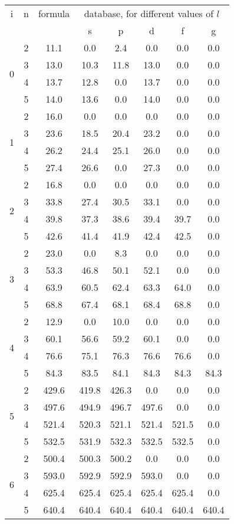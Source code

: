 \begin{tabular}{|c|c||c||c|c|c|c|c|}
\hline
i & n & formula & \multicolumn{5}{c|}{database, for different values of $l$} \tabularnewline
 & & & s & p & d & f & g \tabularnewline
\hline
\hline
\multirow{4}{*}{  0} 
 &   2 &   11.1 &    0.0 &    2.4 &    0.0 &    0.0 &    0.0 \tabularnewline
 &   3 &   13.0 &   10.3 &   11.8 &   13.0 &    0.0 &    0.0 \tabularnewline
 &   4 &   13.7 &   12.8 &    0.0 &   13.7 &    0.0 &    0.0 \tabularnewline
 &   5 &   14.0 &   13.6 &    0.0 &   14.0 &    0.0 &    0.0 \tabularnewline
\hline
\multirow{4}{*}{  1} 
 &   2 &   16.0 &    0.0 &    0.0 &    0.0 &    0.0 &    0.0 \tabularnewline
 &   3 &   23.6 &   18.5 &   20.4 &   23.2 &    0.0 &    0.0 \tabularnewline
 &   4 &   26.2 &   24.4 &   25.1 &   26.0 &    0.0 &    0.0 \tabularnewline
 &   5 &   27.4 &   26.6 &    0.0 &   27.3 &    0.0 &    0.0 \tabularnewline
\hline
\multirow{4}{*}{  2} 
 &   2 &   16.8 &    0.0 &    0.0 &    0.0 &    0.0 &    0.0 \tabularnewline
 &   3 &   33.8 &   27.4 &   30.5 &   33.1 &    0.0 &    0.0 \tabularnewline
 &   4 &   39.8 &   37.3 &   38.6 &   39.4 &   39.7 &    0.0 \tabularnewline
 &   5 &   42.6 &   41.4 &   41.9 &   42.4 &   42.5 &    0.0 \tabularnewline
\hline
\multirow{4}{*}{  3} 
 &   2 &   23.0 &    0.0 &    8.3 &    0.0 &    0.0 &    0.0 \tabularnewline
 &   3 &   53.3 &   46.8 &   50.1 &   52.1 &    0.0 &    0.0 \tabularnewline
 &   4 &   63.9 &   60.5 &   62.4 &   63.3 &   64.0 &    0.0 \tabularnewline
 &   5 &   68.8 &   67.4 &   68.1 &   68.4 &   68.8 &    0.0 \tabularnewline
\hline
\multirow{4}{*}{  4} 
 &   2 &   12.9 &    0.0 &   10.0 &    0.0 &    0.0 &    0.0 \tabularnewline
 &   3 &   60.1 &   56.6 &   59.2 &   60.1 &    0.0 &    0.0 \tabularnewline
 &   4 &   76.6 &   75.1 &   76.3 &   76.6 &   76.6 &    0.0 \tabularnewline
 &   5 &   84.3 &   83.5 &   84.1 &   84.3 &   84.3 &   84.3 \tabularnewline
\hline
\multirow{4}{*}{  5} 
 &   2 &  429.6 &  419.8 &  426.3 &    0.0 &    0.0 &    0.0 \tabularnewline
 &   3 &  497.6 &  494.9 &  496.7 &  497.6 &    0.0 &    0.0 \tabularnewline
 &   4 &  521.4 &  520.3 &  521.1 &  521.4 &  521.5 &    0.0 \tabularnewline
 &   5 &  532.5 &  531.9 &  532.3 &  532.5 &  532.5 &    0.0 \tabularnewline
\hline
\multirow{4}{*}{  6} 
 &   2 &  500.4 &  500.3 &  500.2 &    0.0 &    0.0 &    0.0 \tabularnewline
 &   3 &  593.0 &  592.9 &  592.9 &  593.0 &    0.0 &    0.0 \tabularnewline
 &   4 &  625.4 &  625.4 &  625.4 &  625.4 &  625.4 &    0.0 \tabularnewline
 &   5 &  640.4 &  640.4 &  640.4 &  640.4 &  640.4 &  640.4 \tabularnewline
\hline
\end{tabular}
